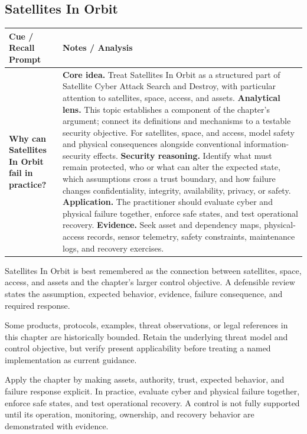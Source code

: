 \documentclass[11pt]{article}
\newcommand{\CornellHeader}{%
\rowcolor{Navy}\color{white}\bfseries Cue / Recall Prompt & \color{white}\bfseries Notes / Analysis\\\hline}
\newcommand{\CornellRow}[2]{%
\cellcolor{CueGray}\RaggedRight\textbf{#1} & \RaggedRight #2\\\hline}
\begin{document}
\subsection*{Satellites In Orbit}
\begin{longtable}{>{\RaggedRight\arraybackslash}p{}|>{\RaggedRight\arraybackslash}p{}}
\CornellHeader
\CornellRow{Why can Satellites In Orbit fail in practice?}{\textbf{Core idea.} Treat Satellites In Orbit as a structured part of Satellite Cyber Attack Search and Destroy, with particular attention to satellites, space, access, and assets. \textbf{Analytical lens.} This topic establishes a component of the chapter's argument; connect its definitions and mechanisms to a testable security objective. For satellites, space, and access, model safety and physical consequences alongside conventional information-security effects. \textbf{Security reasoning.} Identify what must remain protected, who or what can alter the expected state, which assumptions cross a trust boundary, and how failure changes confidentiality, integrity, availability, privacy, or safety. \textbf{Application.} The practitioner should evaluate cyber and physical failure together, enforce safe states, and test operational recovery. \textbf{Evidence.} Seek asset and dependency maps, physical-access records, sensor telemetry, safety constraints, maintenance logs, and recovery exercises.}
\end{longtable}
\begin{topicsummary}
Satellites In Orbit is best remembered as the connection between satellites, space, access, and assets and the chapter's larger control objective. A defensible review states the assumption, expected behavior, evidence, failure consequence, and required response.
\end{topicsummary}
\begin{historybox}
Some products, protocols, examples, threat observations, or legal references in this chapter are historically bounded. Retain the underlying threat model and control objective, but verify present applicability before treating a named implementation as current guidance.
\end{historybox}
\begin{defensebox}
Apply the chapter by making assets, authority, trust, expected behavior, and failure response explicit. In practice, evaluate cyber and physical failure together, enforce safe states, and test operational recovery. A control is not fully supported until its operation, monitoring, ownership, and recovery behavior are demonstrated with evidence.
\end{defensebox}
\end{document}

